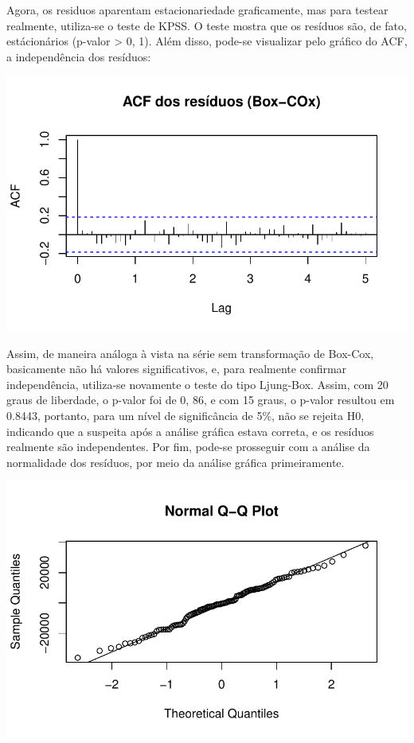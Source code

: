 \documentclass[
  letterpaper,
  DIV=11,
  numbers=noendperiod]{scrartcl}
\begin{document}
Agora, os residuos aparentam estacionariedade graficamente, mas para
testear realmente, utiliza-se o teste de KPSS. O teste mostra que os
resíduos são, de fato, estácionários (p-valor \textgreater{} 0, 1). Além
disso, pode-se visualizar pelo gráfico do ACF, a independência dos
resíduos:

\includegraphics{T2_grupo10_files/figure-pdf/unnamed-chunk-9-1.pdf}

Assim, de maneira análoga à vista na série sem transformação de Box-Cox,
basicamente não há valores significativos, e, para realmente confirmar
independência, utiliza-se novamente o teste do tipo Ljung-Box. Assim,
com 20 graus de liberdade, o p-valor foi de 0, 86, e com 15 graus, o
p-valor resultou em 0.8443, portanto, para um nível de significância de
5\%, não se rejeita H0, indicando que a suspeita após a análise gráfica
estava correta, e os resíduos realmente são independentes. Por fim,
pode-se prosseguir com a análise da normalidade dos resíduos, por meio
da análise gráfica primeiramente.

\includegraphics{T2_grupo10_files/figure-pdf/unnamed-chunk-10-1.pdf}
\end{document}
